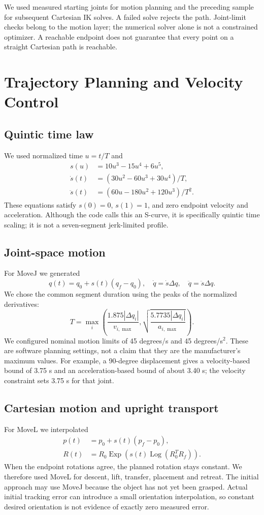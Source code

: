 \documentclass[11pt,a4paper]{report}
\begin{document}
We used measured starting joints for motion planning and the preceding sample for subsequent Cartesian IK solves. A failed solve rejects the path. Joint-limit checks belong to the motion layer; the numerical solver alone is not a constrained optimizer. A reachable endpoint does not guarantee that every point on a straight Cartesian path is reachable.
\chapter{Trajectory Planning and Velocity Control}
\section{Quintic time law}
We used normalized time $u=t/T$ and
\begin{align}
s(u)&=10u^3-15u^4+6u^5,\\
\dot{s}(t)&=(30u^2-60u^3+30u^4)/T,\\
\ddot{s}(t)&=(60u-180u^2+120u^3)/T^2.
\end{align}
These equations satisfy $s(0)=0$, $s(1)=1$, and zero endpoint velocity and acceleration. Although the code calls this an S-curve, it is specifically quintic time scaling; it is not a seven-segment jerk-limited profile.
\section{Joint-space motion}
For MoveJ we generated
\begin{equation}q(t)=q_0+s(t)(q_f-q_0),\quad\dot q=\dot s\Delta q,\quad\ddot q=\ddot s\Delta q.\end{equation}
We chose the common segment duration using the peaks of the normalized derivatives:
\begin{equation}
T=\max_i\left(\frac{1.875|\Delta q_i|}{v_{i,\max}},
\sqrt{\frac{5.7735|\Delta q_i|}{a_{i,\max}}}\right).
\end{equation}
We configured nominal motion limits of 45 degrees/s and 45 degrees/s$^2$. These are software planning settings, not a claim that they are the manufacturer's maximum values. For example, a 90-degree displacement gives a velocity-based bound of 3.75 s and an acceleration-based bound of about 3.40 s; the velocity constraint sets 3.75 s for that joint.
\section{Cartesian motion and upright transport}
For MoveL we interpolated
\begin{align}
p(t)&=p_0+s(t)(p_f-p_0),\\
R(t)&=R_0\operatorname{Exp}\left(s(t)\operatorname{Log}(R_0^TR_f)\right).
\end{align}
When the endpoint rotations agree, the planned rotation stays constant. We therefore used MoveL for descent, lift, transfer, placement and retreat. The initial approach may use MoveJ because the object has not yet been grasped. Actual initial tracking error can introduce a small orientation interpolation, so constant desired orientation is not evidence of exactly zero measured error.
\end{document}
